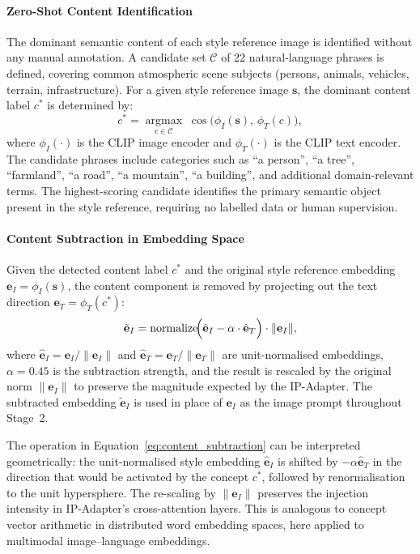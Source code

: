 \paragraph{Zero-Shot Content Identification}
The dominant semantic content of each style reference image is identified without any manual annotation. A candidate set $\mathcal{C}$ of 22 natural-language phrases is defined, covering common atmospheric scene subjects (persons, animals, vehicles, terrain, infrastructure). For a given style reference image $\mathbf{s}$, the dominant content label $c^*$ is determined by:
\begin{equation}
    c^* = \operatorname*{argmax}_{c \in \mathcal{C}} \; \cos\!\bigl(\phi_I(\mathbf{s}),\, \phi_T(c)\bigr),
    \label{eq:content_detection}
\end{equation}
where $\phi_I(\cdot)$ is the CLIP image encoder and $\phi_T(\cdot)$ is the CLIP text encoder. The candidate phrases include categories such as ``a person'', ``a tree'', ``farmland'', ``a road'', ``a mountain'', ``a building'', and additional domain-relevant terms. The highest-scoring candidate identifies the primary semantic object present in the style reference, requiring no labelled data or human supervision.

\paragraph{Content Subtraction in Embedding Space}
Given the detected content label $c^*$ and the original style reference embedding $\mathbf{e}_I = \phi_I(\mathbf{s})$, the content component is removed by projecting out the text direction $\mathbf{e}_T = \phi_T(c^*)$:
\begin{equation}
    \tilde{\mathbf{e}}_I = \mathrm{normalize}\!\Bigl(\hat{\mathbf{e}}_I - \alpha \cdot \hat{\mathbf{e}}_T\Bigr) \cdot \|\mathbf{e}_I\|,
    \label{eq:content_subtraction}
\end{equation}
where $\hat{\mathbf{e}}_I = \mathbf{e}_I / \|\mathbf{e}_I\|$ and $\hat{\mathbf{e}}_T = \mathbf{e}_T / \|\mathbf{e}_T\|$ are unit-normalised embeddings, $\alpha = 0.45$ is the subtraction strength, and the result is rescaled by the original norm $\|\mathbf{e}_I\|$ to preserve the magnitude expected by the IP-Adapter. The subtracted embedding $\tilde{\mathbf{e}}_I$ is used in place of $\mathbf{e}_I$ as the image prompt throughout Stage~2.

\noindent The operation in Equation~\ref{eq:content_subtraction} can be interpreted geometrically: the unit-normalised style embedding $\hat{\mathbf{e}}_I$ is shifted by $-\alpha \hat{\mathbf{e}}_T$ in the direction that would be activated by the concept $c^*$, followed by renormalisation to the unit hypersphere. The re-scaling by $\|\mathbf{e}_I\|$ preserves the injection intensity in IP-Adapter's cross-attention layers. This is analogous to concept vector arithmetic in distributed word embedding spaces, here applied to multimodal image–language embeddings.


